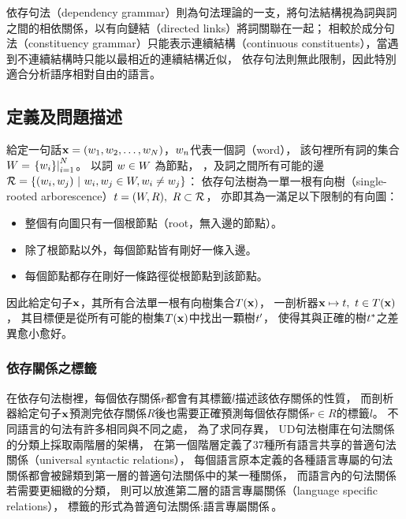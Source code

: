 依存句法（dependency grammar）則為句法理論的一支，將句法結構視為詞與詞之間的相依關係，以有向鏈結（directed links）將詞關聯在一起；
相較於成分句法（constituency grammar）只能表示連續結構（continuous constituents），當遇到不連續結構時只能以最相近的連續結構近似，
依存句法則無此限制，因此特別適合分析語序相對自由的語言。

\subsection{定義及問題描述}
給定一句話$\mathbf{x} = (w_{1}, w_{2}, \ldots, w_{N})$，$w_{n}$代表一個詞（word），
該句裡所有詞的集合$W = \left.\{w_{i}\}\right\vert_{i=1}^{N}$。
以詞 $w \in W$ 為節點，
，及詞之間所有可能的邊
$\mathcal{R} = \{(w_{i}, w_{j})\ |\ w_{i},w_{j} \in W, w_{i} \neq w_{j}\}$：
依存句法樹為一單一根有向樹（single-rooted arborescence）$t=(W, R),\ R \subset \mathcal{R}$，
亦即其為一滿足以下限制的有向圖：
\begin{itemize}
    \item 整個有向圖只有一個根節點（root，無入邊的節點）。
    \item 除了根節點以外，每個節點皆有剛好一條入邊。
    \item 每個節點都存在剛好一條路徑從根節點到該節點。
\end{itemize}

因此給定句子$\mathbf{x}$，其所有合法單一根有向樹集合$\MakeUppercase{\MTree}(\MSent)$，
一剖析器$\MSent \mapsto \MTree,\ \MTree \in \MakeUppercase{\MTree}(\MSent)$，
其目標便是從所有可能的樹集$\MakeUppercase{\MTree}(\MSent)$中找出一顆樹$t'$，
使得其與正確的樹$t^{*}$之差異愈小愈好。

\subsubsection{依存關係之標籤}
在依存句法樹裡，每個依存關係$r$都會有其標籤$l$描述該依存關係的性質，
而剖析器給定句子$\mathbf{x}$預測完依存關係$R$後也需要正確預測每個依存關係$r \in R$的標籤$l$。
不同語言的句法有許多相同與不同之處，
為了求同存異，
UD句法樹庫在句法關係的分類上採取兩階層的架構，
在第一個階層定義了37種所有語言共享的普適句法關係（universal syntactic relations），
每個語言原本定義的各種語言專屬的句法關係都會被歸類到第一層的普適句法關係中的某一種關係，
而語言內的句法關係若需要更細緻的分類，
則可以放進第二層的語言專屬關係（language specific relations），
標籤的形式為$\textrm{普適句法關係}:\textrm{語言專屬關係}$。

